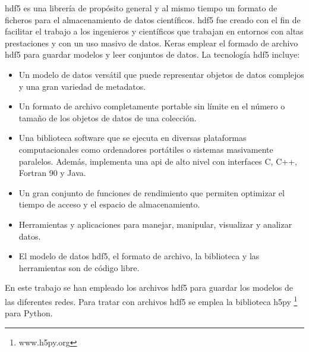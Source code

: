 \acrfull{hdf5} \cite{hdf5_1} \cite{hdf5_2} es una librería de propósito general y al mismo tiempo un formato de ficheros para el almacenamiento de datos científicos. \acrshort{hdf5} fue creado con el fin de facilitar el trabajo a los ingenieros y científicos que trabajan en entornos con altas prestaciones y con un uso masivo de datos. Keras emplear el formado de archivo \acrshort{hdf5} para guardar modelos y leer conjuntos de datos. La tecnología \acrshort{hdf5} incluye:

\begin{itemize}
    \item Un modelo de datos versátil que puede representar objetos de datos complejos y una gran variedad de metadatos.
    
    \item Un formato de archivo completamente portable sin límite en el número o tamaño de los objetos de datos de una colección.
    
    \item Una biblioteca software que se ejecuta en diversas plataformas computacionales como ordenadores portátiles o sistemas masivamente paralelos. Además, implementa una \acrshort{api} de alto nivel con interfaces C, C++, Fortran 90 y Java.
    
    \item Un gran conjunto de funciones de rendimiento que permiten optimizar el tiempo de acceso y el espacio de almacenamiento.
    
    \item Herramientas y aplicaciones para manejar, manipular, visualizar y analizar datos.
    
    \item El modelo de datos \acrshort{hdf5}, el formato de archivo, la biblioteca y las herramientas son de código libre.
\end{itemize}

En este trabajo se han empleado los archivos \acrshort{hdf5} para guardar los modelos de las diferentes redes. Para tratar con archivos \acrshort{hdf5} se emplea la biblioteca h5py \footnote{www.h5py.org} para Python.

